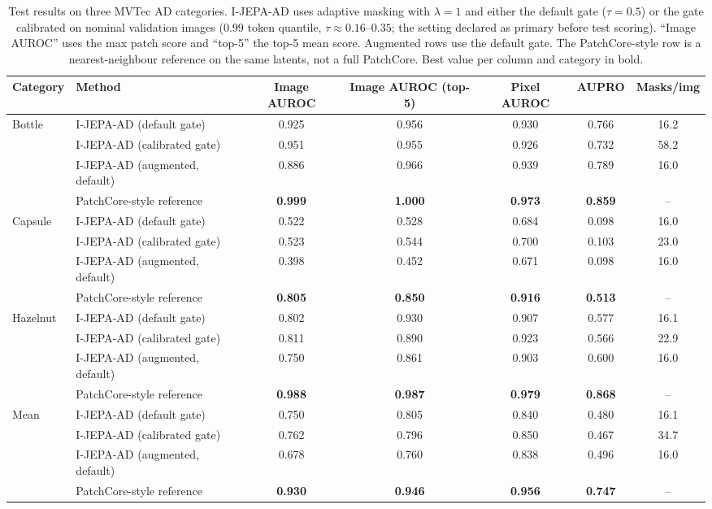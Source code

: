 \documentclass[conference]{IEEEtran}
\begin{document}
\begin{table}[t]
\caption{Test results on three MVTec AD categories. I-JEPA-AD uses adaptive masking with $\lambda=1$ and either the default gate ($\tau=0.5$) or the gate calibrated on nominal validation images (0.99 token quantile, $\tau\approx0.16$--$0.35$; the setting declared as primary before test scoring). ``Image AUROC'' uses the max patch score and ``top-5'' the top-5 mean score. Augmented rows use the default gate. The PatchCore-style row is a nearest-neighbour reference on the same latents, not a full PatchCore. Best value per column and category in bold.}
\label{tab:main}
\centering
\footnotesize
\begin{tabular}{llccccc}
\hline
\textbf{Category} & \textbf{Method} & \textbf{Image AUROC} & \textbf{Image AUROC (top-5)} & \textbf{Pixel AUROC} & \textbf{AUPRO} & \textbf{Masks/img} \\
\hline
\multirow{4}{*}{Bottle}
 & I-JEPA-AD (default gate)        & 0.925 & 0.956 & 0.930 & 0.766 & 16.2 \\
 & I-JEPA-AD (calibrated gate)     & 0.951 & 0.955 & 0.926 & 0.732 & 58.2 \\
 & I-JEPA-AD (augmented, default)  & 0.886 & 0.966 & 0.939 & 0.789 & 16.0 \\
 & PatchCore-style reference       & \textbf{0.999} & \textbf{1.000} & \textbf{0.973} & \textbf{0.859} & -- \\
\hline
\multirow{4}{*}{Capsule}
 & I-JEPA-AD (default gate)        & 0.522 & 0.528 & 0.684 & 0.098 & 16.0 \\
 & I-JEPA-AD (calibrated gate)     & 0.523 & 0.544 & 0.700 & 0.103 & 23.0 \\
 & I-JEPA-AD (augmented, default)  & 0.398 & 0.452 & 0.671 & 0.098 & 16.0 \\
 & PatchCore-style reference       & \textbf{0.805} & \textbf{0.850} & \textbf{0.916} & \textbf{0.513} & -- \\
\hline
\multirow{4}{*}{Hazelnut}
 & I-JEPA-AD (default gate)        & 0.802 & 0.930 & 0.907 & 0.577 & 16.1 \\
 & I-JEPA-AD (calibrated gate)     & 0.811 & 0.890 & 0.923 & 0.566 & 22.9 \\
 & I-JEPA-AD (augmented, default)  & 0.750 & 0.861 & 0.903 & 0.600 & 16.0 \\
 & PatchCore-style reference       & \textbf{0.988} & \textbf{0.987} & \textbf{0.979} & \textbf{0.868} & -- \\
\hline
\multirow{4}{*}{Mean}
 & I-JEPA-AD (default gate)        & 0.750 & 0.805 & 0.840 & 0.480 & 16.1 \\
 & I-JEPA-AD (calibrated gate)     & 0.762 & 0.796 & 0.850 & 0.467 & 34.7 \\
 & I-JEPA-AD (augmented, default)  & 0.678 & 0.760 & 0.838 & 0.496 & 16.0 \\
 & PatchCore-style reference       & \textbf{0.930} & \textbf{0.946} & \textbf{0.956} & \textbf{0.747} & -- \\
\hline
\end{tabular}
\end{table}
\end{document}
